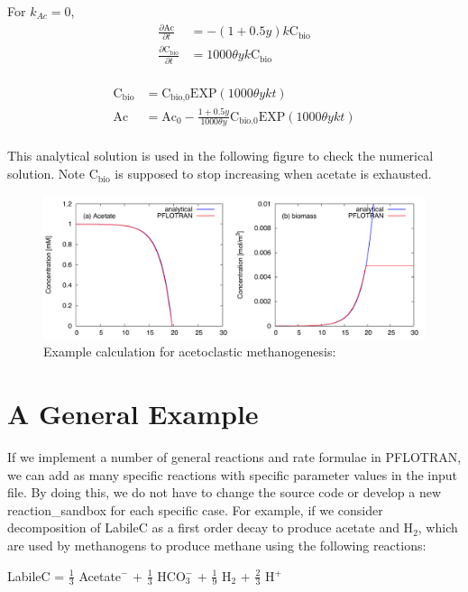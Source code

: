\documentclass[12pt, a4paper]{article}
\begin{document}
For  $k_{Ac} = 0$, 
\begin{align*}
\frac{\partial \text{Ac}}{\partial t} &= -(1 + 0.5y) k \text{C}_\text{bio} \\
\frac{\partial \text{C}_\text{bio}}{\partial t} &= 1000\theta y k \text{C}_\text{bio} \\
\end{align*}

\begin{align*}
\text{C}_\text{bio} &= \text{C}_\text{bio,0} \text{EXP}(1000\theta ykt) \\
\text{Ac} &= \text{Ac}_0 - \frac{1+0.5y}{1000\theta y}\text{C}_\text{bio,0} \text{EXP}(1000\theta ykt)  \\
\end{align*}

This analytical solution is used in the following figure to check the numerical solution. Note $\text{C}_\text{bio}$ is supposed to stop increasing when acetate is exhausted. 

\begin{figure}[h]
\centering
\includegraphics[width=1.0\textwidth]{../acemeg/fig.pdf}
\caption{Example calculation for acetoclastic methanogenesis: }
\label{Fig4}
\end{figure}

\clearpage
\section{A General Example}
If we implement a number of general reactions and rate formulae in PFLOTRAN, we can add as many specific reactions with specific parameter values in the input file. By doing this, we do not have to change the source code or develop a new reaction\_sandbox for each specific case. For example, if we consider decomposition of LabileC as a first order decay to produce acetate and H$_2$, which are used by methanogens to produce methane using the following reactions:

LabileC = $\frac{1}{3}$ Acetate$^-$ + $\frac{1}{3}$ HCO$_3^-$ + $\frac{1}{9}$ H$_2$ + $\frac{2}{3}$ H$^+$
\end{document}
